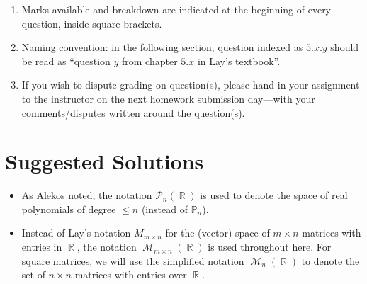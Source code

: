 \documentclass{amsart}
\theoremstyle{definition}
\theoremstyle{definition}
\DeclareMathOperator{\R}{\mathbb{R}}
\DeclareMathOperator{\1}{\mathbbm{1}}
\DeclareMathOperator{\MM}{\mathcal{M}}
\renewcommand{\leq}{\leqslant}
\newcommand{\polyn}[2]{\mathcal{P}_{#1}(#2)}
\begin{document}
\begin{enumerate}[itemsep=.75em]
		\item Marks available and breakdown are indicated at the beginning of every question, inside square brackets. 
		
		\item Naming convention: in the following section, question indexed as $5.x.y$ should be read as ``question $y$ from chapter $5.x$ in Lay's textbook''.
		
		\item If you wish to dispute grading on question(s), please hand in your assignment to the instructor on the next homework submission day---with your comments/disputes written around the question(s).
		
	\end{enumerate}
	
	
	
	\clearpage
	
	\section*{Suggested Solutions}
	
	\begin{itemize}
		\item As Alekos noted, the notation $\polyn{n}{\R}$ is used to denote the space of real polynomials of degree $\leq n$ (instead of $\mathbb{P}_n$).
		\item
		Instead of Lay's notation $M_{m \times n}$ for the (vector) space of $m \times n$ matrices with entries in $\R$, the notation $\MM_{m \times n}(\R)$ is used throughout here. For square matrices, we will use the simplified notation $\MM_{n}(\R)$ to denote the set of $n \times n$ matrices with entries over $\R$.
	\end{itemize}
	
	\bigskip
	
\end{document}
